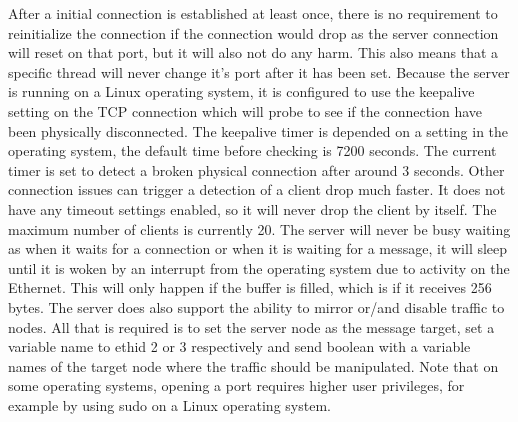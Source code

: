 \newline \noindent After a initial connection is established at least once, there is no requirement to reinitialize the connection if the connection would drop as the server connection will reset on that port, but it will also not do any harm. This also means that a specific thread will never change it's port after it has been set. Because the server is running on a Linux operating system, it is configured to use the keepalive setting on the TCP connection which will probe to see if the connection have been physically disconnected. The keepalive timer is depended on a setting in the operating system, the default time before checking is 7200 seconds. The current timer is set to detect a broken physical connection after around 3 seconds. Other connection issues can trigger a detection of a client drop much faster. It does not have any timeout settings enabled, so it will never drop the client by itself. The maximum number of clients is currently 20. The server will never be busy waiting as when it waits for a connection or when it is waiting for a message, it will sleep until it is woken by an interrupt from the operating system due to activity on the Ethernet. This will only happen if the buffer is filled, which is if it receives 256 bytes. The server does also support the ability to mirror or/and disable traffic to nodes. All that is required is to set the server node as the message target, set a variable name to ethid 2 or 3 respectively and send boolean with a variable names of the target node where the traffic should be manipulated. Note that on some operating systems, opening a port requires higher user privileges, for example by using sudo on a Linux operating system.


